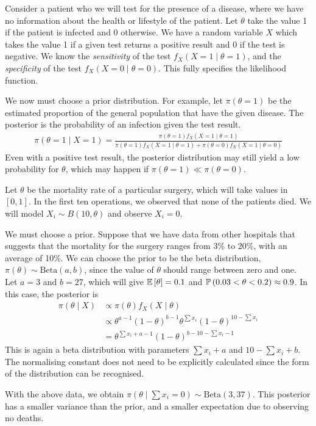 \begin{example}
	Consider a patient who we will test for the presence of a disease, where we have no information about the health or lifestyle of the patient.
	Let $\theta$ take the value 1 if the patient is infected and 0 otherwise.
	We have a random variable $X$ which takes the value 1 if a given test returns a positive result and 0 if the test is negative.
	We know the \textit{sensitivity} of the test $f_X(X=1\mid \theta=1)$, and the \textit{specificity} of the test $f_X(X=0\mid \theta=0)$.
	This fully specifies the likelihood function.

	We now must choose a prior distribution.
	For example, let $\pi(\theta = 1)$ be the estimated proportion of the general population that have the given disease.
	The posterior is the probability of an infection given the test result.
	\begin{align*}
		\pi(\theta = 1 \mid X = 1) = \frac{\pi(\theta = 1) f_X(X = 1 \mid \theta = 1)}{\pi(\theta = 1) f_X(X = 1 \mid \theta = 1) + \pi(\theta = 0) f_X(X = 1 \mid \theta = 0)}
	\end{align*}
	Even with a positive test result, the posterior distribution may still yield a low probability for $\theta$, which may happen if $\pi(\theta = 1) \ll \pi(\theta = 0)$.
\end{example}

\begin{example}
	Let $\theta$ be the mortality rate of a particular surgery, which will take values in $[0,1]$.
	In the first ten operations, we observed that none of the patients died.
	We will model $X_i \sim B(10,\theta)$ and observe $X_i = 0$.

	We must choose a prior.
	Suppose that we have data from other hospitals that suggests that the mortality for the surgery ranges from 3\% to 20\%, with an average of 10\%.
	We can choose the prior to be the beta distribution, $\pi(\theta) \sim \mathrm{Beta}(a,b)$, since the value of $\theta$ should range between zero and one.
	Let $a = 3$ and $b = 27$, which will give $\mathbb{E}\left[{\theta}\right] = 0.1$ and $\mathbb{P}\left({0.03 < \theta < 0.2}\right) \approx 0.9$.
	In this case, the posterior is
	\begin{align*}
		\pi(\theta \mid X) &\propto \pi(\theta) f_X(X\mid \theta) \\
		&\propto \theta^{a-1} (1-\theta)^{b-1} \theta^{\sum x_i} (1-\theta)^{10 - \sum x_i} \\
		&= \theta^{\sum x_i +a-1} (1-\theta)^{b - 10 - \sum x_i -1}
	\end{align*}
	This is again a beta distribution with parameters $\sum x_i + a$ and $10 - \sum x_i + b$.
	The normalising constant does not need to be explicitly calculated since the form of the distribution can be recognised.

	With the above data, we obtain $\pi(\theta \mid \sum x_i = 0) \sim \mathrm{Beta}(3,37)$.
	This posterior has a smaller variance than the prior, and a smaller expectation due to observing no deaths.
\end{example}

